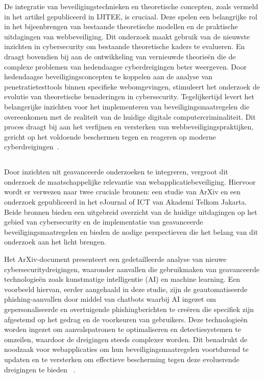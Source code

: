 De integratie van beveiligingstechnieken en theoretische concepten, zoals vermeld in het artikel gepubliceerd in IJITEE, is cruciaal. Deze spelen een belangrijke rol 
in het bijeenbrengen van bestaande theoretische modellen en de praktische uitdagingen van webbeveiliging. Dit onderzoek maakt gebruik van de nieuwste inzichten in cybersecurity 
om bestaande theoretische kaders te evalueren. En draagt bovendien bij aan de ontwikkeling van vernieuwde theorieën die de complexe problemen van hedendaagse 
cyberdreigingen beter weergeven. Door hedendaagse beveiligingsconcepten te koppelen aan de analyse van penetratietesttools binnen specifieke webomgevingen, 
stimuleert het onderzoek de evolutie van theoretische benaderingen in cybersecurity. Tegelijkertijd levert het belangerijke inzichten voor het implementeren van beveiligingsmaatregelen
die overeenkomen met de realiteit van de huidige digitale computercriminaliteit.
Dit proces draagt bij aan het verfijnen en versterken van webbeveiligingspraktijken, gericht op het voldoende beschermen tegen en reageren op moderne 
cyberdreigingen~\autocite{Nagendran2019}.

\subsection{}
Door inzichten uit geavanceerde onderzoeken te integreren, vergroot dit onderzoek de maatschappelijke relevantie van webapplicatiebeveiliging. Hiervoor wordt er verwezen naar 
twee cruciale bronnen: een studie van ArXiv en een onderzoek gepubliceerd in het eJournal of ICT van Akademi Telkom Jakarta. Beide bronnen bieden een uitgebreid overzicht 
van de huidige uitdagingen op het gebied van cybersecurity en de implementatie van geavanceerde beveiligingsmaatregelen en bieden de nodige perspectieven die het 
belang van dit onderzoek aan het licht brengen.

Het ArXiv-document presenteert een gedetailleerde analyse van nieuwe cybersecuritydreigingen, waaronder aanvallen die gebruikmaken van geavanceerde technologieën zoals 
kunstmatige intelligentie (AI) en machine learning. Een voorbeeld hiervan, eerder aangehaald in deze studie, zijn de geautomatiseerde phishing-aanvallen door middel van chatbots waarbij AI ingezet om 
gepersonaliseerde en overtuigende phishingberichten te creëren die specifiek zijn afgestemd op het gedrag en de voorkeuren van gebruikers. Deze technologieën worden ingezet om 
aanvalspatronen te optimaliseren en detectiesystemen te omzeilen, waardoor de dreigingen steeds complexer worden. Dit benadrukt de noodzaak voor webapplicaties om hun 
beveiligingsmaatregelen voortdurend te updaten en te versterken om effectieve bescherming tegen deze evoluerende dreigingen te bieden ~\autocite{Deng2023}.

